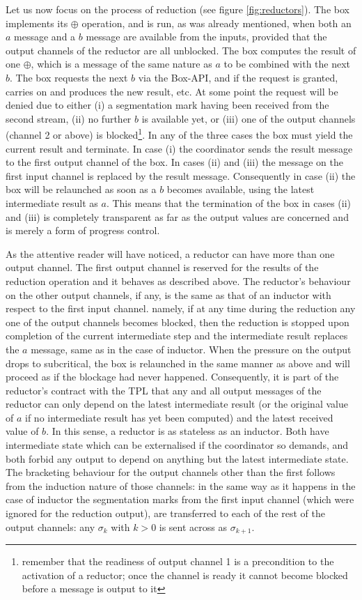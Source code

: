 \documentclass[11pt]{report}
\begin{document}
Let us now focus on the process of reduction (see figure  \ref{fig:reductors}). The box implements its $\oplus$ operation, and is run, as was already mentioned, when both an $a$ message and a $b$ message are available from the inputs, provided that the output channels of the reductor are all unblocked.
The box computes the result of one $\oplus$, which is a message of the same nature as $a$ to be combined with the next $b$.
The box requests the next $b$ via the Box-API, and if the request is granted, carries on and produces the new result, etc.
At some point the request will be denied
due to either (i) a segmentation mark having been received from the second stream, (ii) no further $b$ is available yet, or (iii) one of the output channels (channel 2 or above) is blocked\footnote{remember that the readiness of output channel 1 is a precondition to the activation of a reductor; once the channel is ready it cannot become blocked before a message is output to it}. In any of the three cases the box must yield the current result and terminate. In case (i) the coordinator sends the result message to the first output channel of the box. In cases (ii) and (iii) the message on the
first input channel is replaced by the result message. Consequently in case (ii) the box will be relaunched as soon as a $b$ becomes available,
using the latest intermediate result as $a$. This means that the termination of the box in cases (ii) and (iii) is completely transparent as far as the output values are concerned and is merely a form of progress control.

As the attentive reader will have noticed, a reductor can have more than one output channel. The first output channel is reserved for the results of the reduction operation and it behaves as described above.
The reductor's behaviour on the other output channels, if any, is the same as that of an inductor with respect
to the first input channel. namely, if at any time during the reduction any one of the output channels becomes blocked, then the reduction is stopped upon completion of the current intermediate step and the intermediate result replaces the $a$ message, same as in the case of inductor. When the pressure on the output drops to subcritical, the box is relaunched in the same manner as above and will proceed as if the blockage had never happened. Consequently, it is part of the reductor's contract with the TPL that any and all output messages of the reductor can only depend on the latest intermediate result (or the original value of $a$ if no intermediate result has yet been computed) and the latest received value of $b$. In this sense, a reductor is as stateless as an inductor. Both have intermediate state which can be externalised if the coordinator so demands, and both forbid any output to depend on anything but the latest intermediate state.
The bracketing behaviour for the output channels other than the first follows from the induction nature of those channels:
in the same way as it happens in the case of inductor the segmentation marks from the first input channel (which were
ignored for the reduction output), are transferred to each of the rest of the output channels: any $\sigma_k$ with $k>0$
is sent across as $\sigma_{k+1}$.
\end{document}
